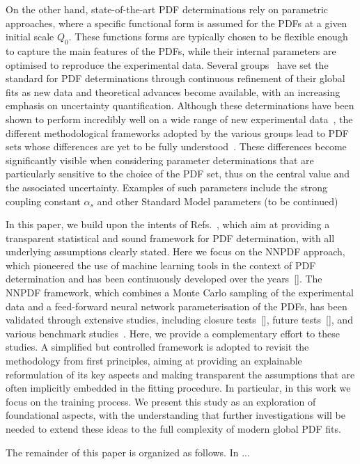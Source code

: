 On the other hand, state-of-the-art PDF determinations rely on parametric approaches,
where a specific functional form is assumed for the PDFs at a given initial
scale $Q_0$. These functions forms are typically chosen to be flexible enough to
capture the main features of the PDFs, while their internal parameters are
optimised to reproduce the experimental data. Several
groups~\cite{NNPDF:2021njg,Ablat:2024hbm,Bailey:2020ooq,Alekhin:2017kpj} have
set the standard for PDF determinations through continuous refinement of their
global fits as new data and theoretical advances become available, with an
increasing emphasis on uncertainty quantification. Although these determinations
have been shown to perform incredibly well on a wide range of new experimental
data~\cite{Chiefa:2025loi}, the different methodological frameworks adopted by
the various groups lead to PDF sets whose differences are yet to be fully
understood~\cite{Harland-Lang:2024kvt}. These differences become significantly
visible when considering parameter determinations that are particularly
sensitive to the choice of the PDF set, thus on the central value and the
associated uncertainty. Examples of such parameters include the strong coupling
constant $\alpha_s$ and other Standard Model parameters (\ac{to be continued})

In this paper, we build upon the intents of
Refs.~\cite{DelDebbio:2021whr,Candido:2024hjt}, which aim at providing a
transparent statistical and sound framework for PDF determination, with all
underlying assumptions clearly stated. Here we focus on the NNPDF approach,
which pioneered the use of machine learning tools in the context of PDF
determination and has been continuously developed over the years~[]. The
NNPDF framework, which combines a Monte Carlo sampling of the experimental data
and a feed-forward neural network parameterisation of the PDFs, has been
validated through extensive studies, including closure tests~[], future
tests~[], and various benchmark studies~\cite{Harland-Lang:2024kvt}. Here,
we provide a complementary effort to these studies. A simplified but controlled
framework is adopted to revisit the methodology from first principles, aiming at
providing an explainable reformulation of its key aspects and making transparent
the assumptions that are often implicitly embedded in the fitting procedure. In
particular, in this work we focus on the training process. We present this study
as an exploration of foundational aspects, with the understanding that further
investigations will be needed to extend these ideas to the full complexity of
modern global PDF fits.

The remainder of this paper is organized as follows. In ...
